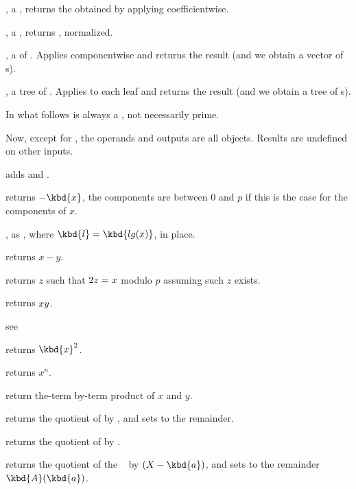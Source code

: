 ,  a , returns the
 obtained by applying  coefficientwise.

,  a , returns , normalized.

,  a  of . Applies
 componentwise and returns the result (and we obtain a vector
of s).

,  a tree of . Applies
 to each leaf and returns the result (and we obtain a tree
of s).

 In what follows  is always a ,
not necessarily prime.

\noindent Now, except for , the operands and outputs are all 
objects. Results are undefined on other inputs.

 adds  and .

 returns $-\kbd{x}$, the components are
between $0$ and $p$ if this is the case for the components of $x$.

, as , where
$\kbd{l} = \kbd{lg(x)}$, in place.

 returns $x-y$.

 returns $z$ such that $2\*z = x$ modulo
$p$ assuming such $z$ exists.

 returns $x\*y$.

see 

 returns $\kbd{x}^2$.

 returns $x^n$.

 return the-term by-term product of $x$
and $y$.

 returns the quotient
of  by , and sets  to the remainder.

 returns the quotient of  by
.

 returns the
quotient of the ~ by $(X - \kbd{a})$, and sets  to the
remainder $\kbd{A}(\kbd{a})$.

